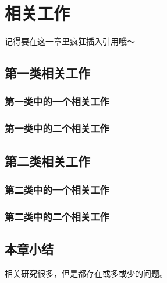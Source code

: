 
\chapter{相关工作}

记得要在这一章里疯狂插入引用\cite{2021模板}哦～

\section{第一类相关工作}

\subsection{第一类中的一个相关工作}

\subsection{第一类中的二个相关工作}

\section{第二类相关工作}

\subsection{第二类中的一个相关工作}

\subsection{第二类中的二个相关工作}

\section{本章小结}

相关研究很多，但是都存在或多或少的问题。
